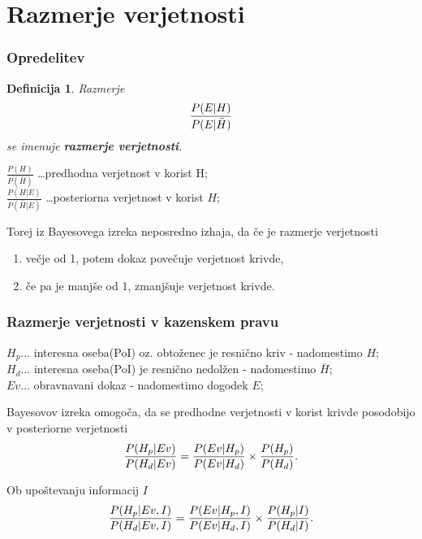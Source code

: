 \documentclass{beamer}
\newtheorem{definicija}{Definicija}
\begin{document}
\section{Razmerje verjetnosti}

\begin{frame}
    \frametitle{Opredelitev}
    \begin{definicija}
        Razmerje
        \[
            \frac{P(E \lvert H)}{P(E \lvert \bar{H})} \vspace{2mm}
        \] 
         se imenuje \textbf{razmerje verjetnosti}.
     \end{definicija} \vspace{2mm}
    $\frac{P(H)}{P(\bar{H})}$ \dots predhodna verjetnost v korist H;\\ \vspace{2mm}
    $\frac{P(H \lvert E)}{P(\bar{H} \lvert E)}$ \dots posteriorna verjetnost v korist $H$;
     \begin{block}{}
        Torej iz Bayesovega izreka neposredno izhaja, da če je razmerje verjetnosti 
        \begin{enumerate}
            \item večje od 1, potem dokaz povečuje verjetnost krivde,
            \item če pa je manjše od 1, zmanjšuje verjetnost krivde.
        \end{enumerate}
     \end{block}
\end{frame}

\begin{frame}
    \frametitle{Razmerje verjetnosti v kazenskem pravu}
    $H_p \dots$ interesna oseba(PoI) oz. obtoženec je resnično kriv - nadomestimo $H$;\\
    $H_d \dots$ interesna oseba(PoI) je resnično nedolžen - nadomestimo $\bar{H}$;\\
    $Ev \dots$ obravnavani dokaz - nadomestimo dogodek $E$;\\
    \begin{block}{Bayesovov izreka omogoča, da se predhodne verjetnosti v korist krivde posodobijo v posteriorne verjetnosti}
        \[
            \frac{P(H_p \lvert Ev)}{P(H_d \lvert Ev)} = \frac{P(Ev \lvert H_p)}{P(Ev \lvert H_d)} \times \frac{P(H_p)}{P(H_d)}. \vspace{2mm}
        \]
    \end{block}\vspace{2mm}
    \begin{block}{Ob upoštevanju informacij $I$}
        \[
            \frac{P(H_p \lvert Ev, I)}{P(H_d \lvert Ev, I)} = \frac{P(Ev \lvert H_p, I)}{P(Ev \lvert H_d, I)} \times \frac{P(H_p \lvert I)}{P(H_d \lvert I)}. \vspace{2mm}
        \]
    \end{block}
\end{frame}
\end{document}
